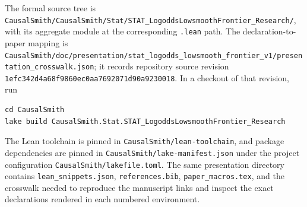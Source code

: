 The formal source tree is
\texttt{CausalSmith/CausalSmith/Stat/STAT\_LogoddsLowsmoothFrontier\_Research/},
with its aggregate module at the corresponding \texttt{.lean} path. The
declaration-to-paper mapping is
\texttt{CausalSmith/doc/presentation/stat\_logodds\_lowsmooth\_frontier\_v1/presentation\_crosswalk.json};
it records repository source revision
\texttt{1efc342d4a68f9860ec0aa7692071d90a9230018}. In a checkout of that revision,
run
\begin{verbatim}
cd CausalSmith
lake build CausalSmith.Stat.STAT_LogoddsLowsmoothFrontier_Research
\end{verbatim}
The Lean toolchain is pinned in \texttt{CausalSmith/lean-toolchain}, and package
dependencies are pinned in \texttt{CausalSmith/lake-manifest.json} under the
project configuration \texttt{CausalSmith/lakefile.toml}. The same presentation
directory contains \texttt{lean\_snippets.json}, \texttt{references.bib},
\texttt{paper\_macros.tex}, and the crosswalk needed to reproduce the manuscript
links and inspect the exact declarations rendered in each numbered environment.
